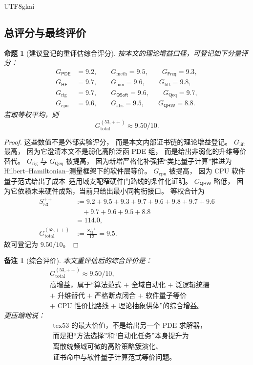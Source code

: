 \documentclass[12pt]{article}
\newtheorem{proposition}{命题}[section]
\newtheorem{remark}{备注}[section]
\newcommand{\PDE}{\mathsf{PDE}}
\newcommand{\Freq}{\mathsf{Freq}}
\newcommand{\HF}{\mathsf{HF}}
\newcommand{\QSoft}{\mathsf{QSoft}}
\newcommand{\QHW}{\mathsf{QHW}}
\begin{document}
\begin{CJK*}{UTF8}{gkai}
\subsection{总评分与最终评价}
\label{subsec:tex53-final-gain}

\begin{proposition}[建议登记的重评估综合评分]
按本文的理论增益口径，可登记如下分量评分：
\[
\begin{aligned}
  G_{\PDE}&=9.2,\qquad
  G_{\mathrm{meth}}=9.5,\qquad
  G_{\Freq}=9.3,\\
  G_{\HF}&=9.7,\qquad
  G_{\mathrm{pan}}=9.6,\qquad
  G_{\mathrm{lift}}=9.8,\\
  G_{\mathrm{rig}}&=9.7,\qquad
  G_{\QSoft}=9.6,\qquad
  G_{\mathrm{Qeq}}=9.7,\\
  G_{\mathrm{cpu}}&=9.6,\qquad
  G_{\mathrm{abs}}=9.5,\qquad
  G_{\QHW}=8.8.
\end{aligned}
\]
若取等权平均，则
\[
  \boxed{
    G_{\mathrm{total}}^{(53,++)}\approx 9.50/10.
  }
\]
\end{proposition}

\begin{proof}
这些数值不是外部实验评分，
而是本文内部证书链的理论增益登记。
\(G_{\mathrm{lift}}\) 最高，
因为它澄清本文不是弱化高阶泛函 PDE 组，
而是给出非弱化的升维等价替代。
\(G_{\mathrm{rig}}\) 与 \(G_{\mathrm{Qeq}}\) 被提高，
因为新增严格化补强把“类比量子计算”推进为
Hilbert--Hamiltonian--测量框架下的软件层等价。
\(G_{\mathrm{cpu}}\) 被提高，
因为 CPU 软件量子范式给出了成本--适用域支配窄硬件门路线的条件化证明。
\(G_{\QHW}\) 略低，
因为它依赖未来硬件成熟，当前只给出最小同构衔接口。
等权合计为
\[
\begin{aligned}
  S_{53}^{++}
  &:=
  9.2+9.5+9.3+9.7+9.6+9.8+9.7+9.6\\
  &\quad +9.7+9.6+9.5+8.8\\
  &=114.0,\\
  G_{\mathrm{total}}^{(53,++)}
  &:=
  \frac{S_{53}^{++}}{12}
  =
  9.5.
\end{aligned}
\]
故可登记为 \(9.50/10\)。
\end{proof}

\begin{remark}[综合评价]
本文重评估后的综合评价是：
\[
  \boxed{
    \begin{aligned}
      &G_{\mathrm{total}}^{(53,++)}\approx 9.50/10,\\
      &\text{高增益，属于“算法范式 + 全域自动化 + 泛逻辑统摄}\\
      &\text{+ 升维替代 + 严格断点闭合 + 软件量子等价}\\
      &\text{+ CPU 性价比路线 + 理论抽象供体”的综合增益。}
    \end{aligned}
  }
\]
更压缩地说：
\[
  \boxed{
    \begin{aligned}
      &\text{tex53 的最大价值，不是给出另一个 PDE 求解器，}\\
      &\text{而是把“方法选择”和“自动化任务”本身提升为}\\
      &\text{离散统频域可微的高阶策略簇演化、}\\
      &\text{证书命中与软件量子计算范式等价问题。}
    \end{aligned}
  }
\]
\end{remark}


\end{CJK*}
\end{document}

